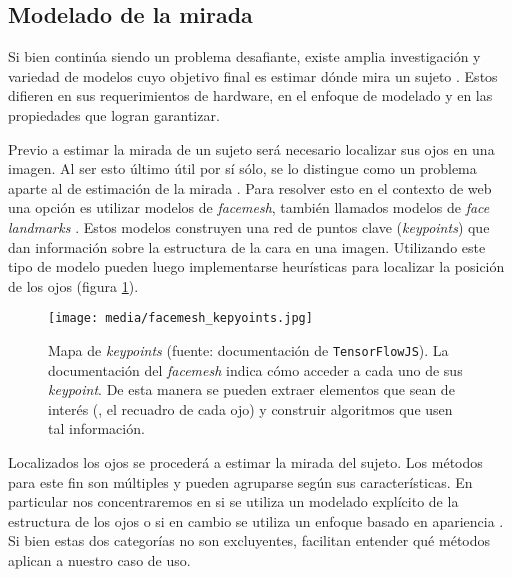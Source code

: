\subsection{Modelado de la mirada}

Si bien continúa siendo un problema desafiante, existe amplia investigación y
variedad de modelos cuyo objetivo final es estimar dónde mira un sujeto
\cite{hansen_2009_eye_of_the_beholder}.
Estos difieren en sus requerimientos de hardware, en el enfoque de modelado y
en las propiedades que logran garantizar.

Previo a estimar la mirada de un sujeto será necesario localizar sus ojos en
una imagen.
Al ser esto último útil por sí sólo, se lo distingue como un problema aparte al
de estimación de la mirada \cite{hansen_2009_eye_of_the_beholder}.
Para resolver esto en el contexto de \eyetracking web una opción es utilizar
modelos de \textit{facemesh}, también llamados modelos de \textit{face
landmarks} \cite{papoutsaki_2016_webgazer}.
Estos modelos construyen una red de puntos clave (\textit{keypoints}) que dan
información sobre la estructura de la cara en una imagen.
Utilizando este tipo de modelo pueden luego implementarse heurísticas para
localizar la posición de los ojos (figura \ref{fig:facemesh_keypoints}).

\begin{figure}
    \centering
    \texttt{[image: media/facemesh\_kepyoints.jpg]}
    \caption{
        Mapa de \textit{keypoints}
        (fuente: documentación de \texttt{TensorFlowJS}\protect\footnotemark).
    La documentación del \textit{facemesh} indica cómo acceder a cada uno de
    sus \textit{keypoint}.
    De esta manera se pueden extraer elementos que sean de interés (\eg, el
    recuadro de cada ojo) y construir algoritmos que usen tal información.
    }
    \label{fig:facemesh_keypoints}
\end{figure}

Localizados los ojos se procederá a estimar la mirada del sujeto.
Los métodos para este fin son múltiples y pueden agruparse según
sus características.
En particular nos concentraremos en si se utiliza un modelado explícito de la
estructura de los ojos o si en cambio se utiliza un enfoque basado en
apariencia \cite{hansen_2009_eye_of_the_beholder}.
Si bien estas dos categorías no son excluyentes, facilitan entender qué
métodos aplican a nuestro caso de uso.

